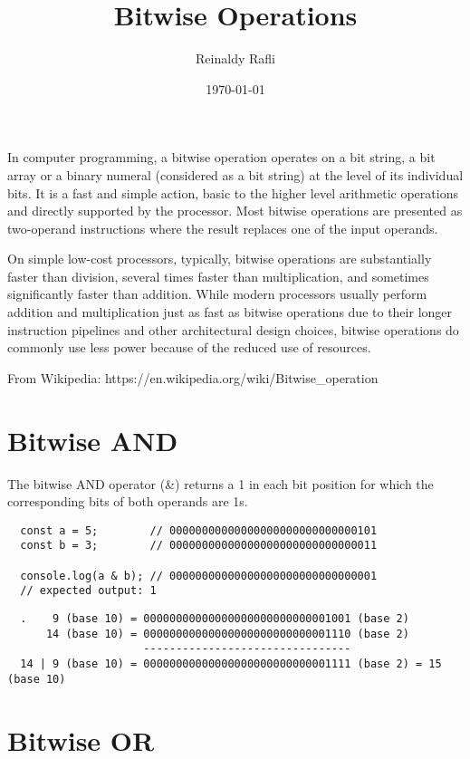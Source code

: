 \documentclass{article}
\author{Reinaldy Rafli}
\date{\today}
\title{Bitwise Operations}
\begin{document}
\maketitle

In computer programming, a bitwise operation operates on a bit string, a bit array or a binary numeral (considered as a bit string) 
at the level of its individual bits. It is a fast and simple action, basic to the higher level arithmetic operations and directly 
supported by the processor. Most bitwise operations are presented as two-operand instructions where the result replaces one of 
the input operands.

On simple low-cost processors, typically, bitwise operations are substantially faster than division, several times faster 
than multiplication, and sometimes significantly faster than addition. While modern processors usually perform addition 
and multiplication just as fast as bitwise operations due to their longer instruction pipelines and other architectural 
design choices, bitwise operations do commonly use less power because of the reduced use of resources.

From Wikipedia: https://en.wikipedia.org/wiki/Bitwise_operation

\section{Bitwise AND}

The bitwise AND operator (&) returns a 1 in each bit position for which the corresponding bits of both operands are 1s.

\begin{verbatim}
  const a = 5;        // 00000000000000000000000000000101
  const b = 3;        // 00000000000000000000000000000011

  console.log(a & b); // 00000000000000000000000000000001
  // expected output: 1
\end{verbatim}

\begin{verbatim}
  .    9 (base 10) = 00000000000000000000000000001001 (base 2)
      14 (base 10) = 00000000000000000000000000001110 (base 2)
                     --------------------------------
  14 | 9 (base 10) = 00000000000000000000000000001111 (base 2) = 15 (base 10)
\end{verbatim}

\section{Bitwise OR}
\end{document}
